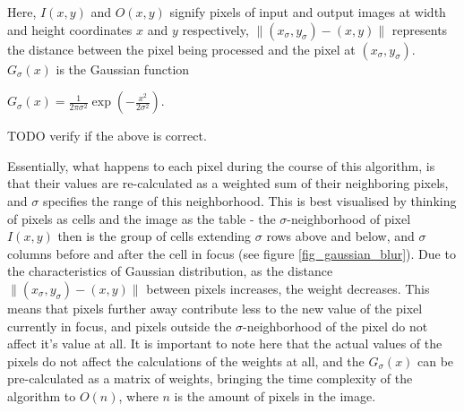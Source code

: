 \documentclass [12pt,a4paper]{report}
\begin{document}
Here, $I(x,y)$ and $O(x,y)$ signify pixels of input and output images at width and height coordinates $x$ and $y$ respectively, $\| (x_\sigma, y_\sigma)-(x, y) \|$ represents the distance between the pixel being processed and the pixel at $(x_\sigma, y_\sigma)$. $G_\sigma(x)$ is the Gaussian function
\begin{center}
$G_\sigma(x) = \frac{1}{2\pi\sigma^2} \exp(-\frac{x^2}{2\sigma^2})$.
\end{center}

TODO verify if the above is correct.

Essentially, what happens to each pixel during the course of this algorithm, is that their values are re-calculated as a weighted sum of their neighboring pixels, and $\sigma$ specifies the range of this neighborhood. This is best visualised by thinking of pixels as cells and the image as the table - the $\sigma$-neighborhood of pixel $I(x,y)$ then is the group of cells extending $\sigma$ rows above and below, and $\sigma$ columns before and after the cell in focus (see figure \ref{fig_gaussian_blur}). Due to the characteristics of Gaussian distribution, as the distance $\| (x_\sigma, y_\sigma)-(x, y) \|$ between pixels increases, the weight decreases. This means that pixels further away contribute less to the new value of the pixel currently in focus, and pixels outside the $\sigma$-neighborhood of the pixel do not affect it's value at all. It is important to note here that the actual values of the pixels do not affect the calculations of the weights at all, and the $G_\sigma(x)$ can be pre-calculated as a matrix of weights, bringing the time complexity of the algorithm to $O(n)$, where $n$ is the amount of pixels in the image.
\end{document}
